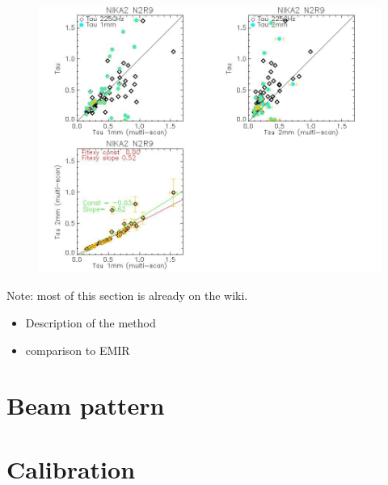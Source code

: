 \documentclass[a4paper, 11pt]{article} %
\begin{document}
\begin{figure}
\begin{center}
\includegraphics[clip, angle=0, scale = 0.5]{Figures/test_allskd_N2R9.jpg}
\caption{}
\label{fig:fov}
\end{center}
\end{figure}


Note: most of this section is already on the wiki.
\begin{itemize}
\item Description of the method
\item comparison to EMIR
\end{itemize}

\section{Beam pattern}




\section{Calibration}
\end{document}
